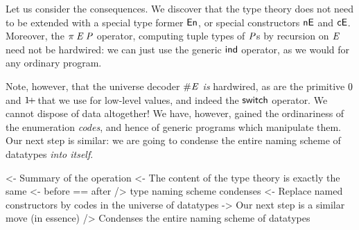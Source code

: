 Let us consider the consequences. We discover that the type
theory does not need to be extended with a special type former $\EnumU$,
or special constructors $\NilE$ and $\NAMEConsE$. 
Moreover, the $\spi{\M{E}}{\M{P}}$ operator, computing tuple types
of \(\mathit{P}\)s by recursion on \(\mathit{E}\) need not be hardwired: we can
just use the generic $\F{ind}$ operator, as we would for any ordinary
program.

Note, however, that the universe decoder \(\EnumT{\M{E}}\) \emph{is}
hardwired, as are the primitive \(\Ze\) and \(\Su{\!}\) that
we use for low-level values, and indeed the \(\F{switch}\) operator.
We cannot dispose of data altogether! We have, however, gained
the ordinariness of the enumeration \emph{codes}, and hence of generic
programs which manipulate them. Our next step is similar: we are going to
condense the entire naming scheme of datatypes \emph{into itself}.


\begin{wstructure}
<- Summary of the operation
    <- The content of the type theory is exactly the same
        <- before == after
    /> type naming scheme condenses
        <- Replace named constructors by codes in the universe of datatypes
    -> Our next step is a similar move (in essence)
        /> Condenses the entire naming scheme of datatypes
\end{wstructure}



